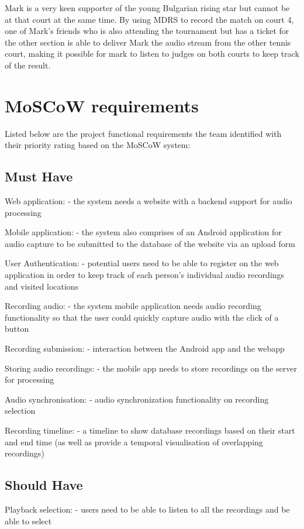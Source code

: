 \documentclass{l3proj}
\begin{document}
Mark is a very keen supporter of the young Bulgarian rising star but cannot be at that court at the same time. By using MDRS to record the match on court 4, one of Mark's friends who is also attending the tournament but has a ticket for the other section is able to deliver Mark the audio stream from the other tennis court, making it possible for mark to listen to judges on both courts to keep track of the result.

\section{MoSCoW requirements}
Listed below are the project functional requirements the team identified with their priority rating based on the MoSCoW system:

\subsection{Must Have}
	Web application:
		- the system needs a website with a backend support for audio processing

	Mobile application:
		- the system also comprises of an Android application for audio capture to be submitted to the database of the website via an upload form

	User Authentication:
		- potential users need to be able to register on the web application in order to keep track of each person's individual audio recordings and visited locations

	Recording audio:
		- the system mobile application needs audio recording functionality so that the user could quickly capture audio with the click of a button

	Recording submission:
		- interaction between the Android app and the webapp

	Storing audio recordings:
		- the mobile app needs to store recordings on the server for processing

	Audio synchronisation:
		- audio synchronization functionality on recording selection

	Recording timeline:
		- a timeline to show database recordings based on their start and end time (as well as provide a temporal visualisation of overlapping recordings)

\subsection{Should Have}
	Playback selection:
		- users need to be able to listen to all the recordings and be able to select
\end{document}
